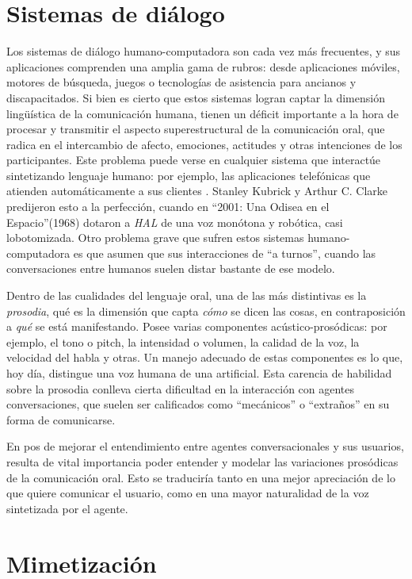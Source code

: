 \section{Sistemas de diálogo}

Los sistemas de diálogo humano-computadora son cada vez más frecuentes, y sus aplicaciones comprenden una amplia gama de rubros: desde aplicaciones móviles, motores de búsqueda, juegos o tecnologías de asistencia para ancianos y discapacitados. Si bien es cierto que estos sistemas logran captar la dimensión lingüística de la comunicación humana, tienen un déficit importante a la hora de procesar y transmitir el aspecto superestructural de la comunicación oral, que radica en el intercambio de afecto, emociones, actitudes y otras intenciones de los participantes. Este problema puede verse en cualquier sistema que interactúe sintetizando lenguaje humano: por ejemplo, las aplicaciones telefónicas que atienden automáticamente a sus clientes \cite{pieraccini2005, raux2006}. Stanley Kubrick y Arthur C. Clarke predijeron esto a la perfección, cuando en ``2001: Una Odisea en el Espacio''(1968) dotaron a \emph{HAL} de una voz monótona y robótica, casi lobotomizada. Otro problema grave que sufren estos sistemas humano-computadora es que asumen que sus interacciones de ``a turnos'', cuando las conversaciones entre humanos suelen distar bastante de ese modelo.

Dentro de las cualidades del lenguaje oral, una de las más distintivas es la \emph{prosodia}, qué es la dimensión que capta \emph{cómo} se dicen las cosas, en contraposición a \emph{qué} se está manifestando. Posee varias componentes acústico-prosódicas: por ejemplo, el tono o pitch, la intensidad o volumen, la calidad de la voz, la velocidad del habla y otras. Un manejo adecuado de estas componentes es lo que, hoy día, distingue una voz humana de una artificial. Esta carencia de habilidad sobre la prosodia conlleva cierta dificultad en la interacción con agentes conversaciones, que suelen ser calificados como ``mecánicos'' o ``extraños'' en su forma de comunicarse. \cite{raux2006, ward2005}

En pos de mejorar el entendimiento entre agentes conversacionales y sus usuarios, resulta de vital importancia poder entender y modelar las variaciones prosódicas de la comunicación oral. Esto se traduciría tanto en una mejor apreciación de lo que quiere comunicar el usuario, como en una mayor naturalidad de la voz sintetizada por el agente.

\section{Mimetización}

